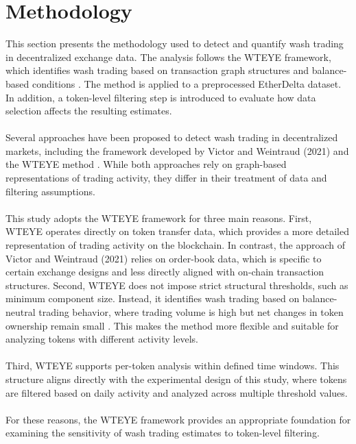 \documentclass[language=english,thesis=bachelor,nosecondtitle,faculty=cb,onesided,13pt]{hsmw-thesis}
\begin{document}
\chapter{Methodology}
This section presents the methodology used to detect and quantify wash trading in decentralized exchange data. The analysis follows the WTEYE framework, which identifies wash trading based on transaction graph structures and balance-based conditions \cite{cui2023chain}. The method is applied to a preprocessed EtherDelta dataset. In addition, a token-level filtering step is introduced to evaluate how data selection affects the resulting estimates.\\
\\
Several approaches have been proposed to detect wash trading in decentralized markets, including the framework developed by Victor and Weintraud (2021) and the WTEYE method \cite{cui2023chain}. While both approaches rely on graph-based representations of trading activity, they differ in their treatment of data and filtering assumptions.\\
\\
This study adopts the WTEYE framework for three main reasons. First, WTEYE operates directly on token transfer data, which provides a more detailed representation of trading activity on the blockchain. In contrast, the approach of Victor and Weintraud (2021) relies on order-book data, which is specific to certain exchange designs and less directly aligned with on-chain transaction structures.
Second, WTEYE does not impose strict structural thresholds, such as minimum component size. Instead, it identifies wash trading based on balance-neutral trading behavior, where trading volume is high but net changes in token ownership remain small \cite{cui2023chain}. This makes the method more flexible and suitable for analyzing tokens with different activity levels.\\
\\
Third, WTEYE supports per-token analysis within defined time windows. This structure aligns directly with the experimental design of this study, where tokens are filtered based on daily activity and analyzed across multiple threshold values.\\
\\
For these reasons, the WTEYE framework provides an appropriate foundation for examining the sensitivity of wash trading estimates to token-level filtering.\\
\\
\end{document}
